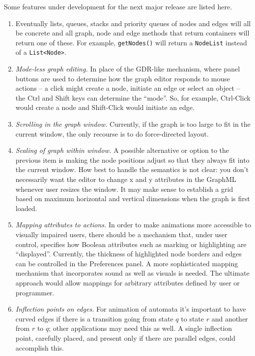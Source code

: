 Some features under development for the next major release are listed here.

\begin{enumerate}
\item \label{item:data_structures}
  Eventually
  lists, queues, stacks and priority queues of nodes and edges will all be
  concrete and all graph, node and edge methods that return containers will
  return one of these. For example, \texttt{getNodes()} will return a
  \texttt{NodeList} instead of a \texttt{List<Node>}.

\item
  \emph{Mode-less graph editing.}
  In place of the GDR-like mechanism, where panel buttons are used to determine
  how the graph editor responds to mouse actions -- a click might create a node,
  initiate an edge or select an object --
  the \textsf{Ctrl} and \textsf{Shift} keys can determine the ``mode''.
  So, for example, \textsf{Ctrl-Click} would create a node and
  \textsf{Shift-Click} would initiate an edge.

\item \emph{Scrolling in the graph window.} Currently, if the graph is too
  large to fit in the current window, the only recourse is to do
  force-directed layout.

\item \emph{Scaling of graph within window.} A possible alternative or option
  to the previous item is making the node positions adjust so that they
  always fit into the current window. How best to handle the semantics is not
  clear: you don't necessarily want the editor to change x and y attributes
  in the GraphML whenever user resizes the window. It may make sense to
  establish a grid based on maximum horizontal and vertical dimensions when
  the graph is first loaded.

\item
  \emph{Mapping attributes to actions.}
  In order to make animations more accessible to visually impaired users,
  there should be a mechanism that, under user control, specifies how Boolean
  attributes such as marking or highlighting are ``displayed''.
  Currently, the thickness of highlighted node borders and edges can be
  controlled in the \textsf{Preferences} panel.
  A more sophisticated mapping mechanism that incorporates sound as well as visuals is needed.
  The ultimate approach would allow mappings for arbitrary attributes
  defined by user or programmer.

\item \emph{Inflection points on edges.}  For animation of automata it's
  important to have curved edges if there is a transition going from state
  $q$ to state $r$ and another from $r$ to $q$; other applications may need
  this as well. A single inflection point, carefully placed, and present only
  if there are parallel edges, could accomplish this.


\end{enumerate}
